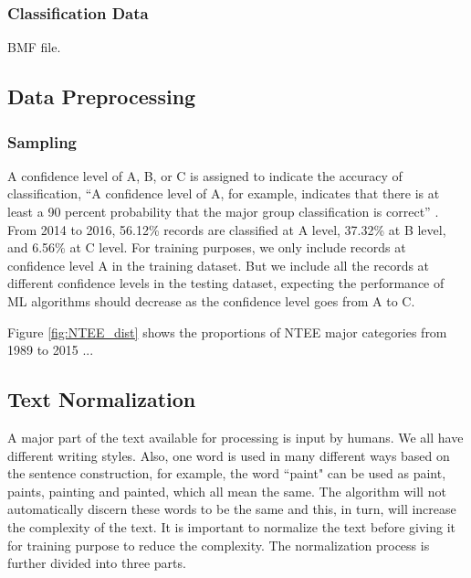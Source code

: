 \documentclass[12pt]{article}
\begin{document}
\subsubsection{Classification Data}
BMF file. 

\subsection{Data Preprocessing}

\subsubsection{Sampling}
A confidence level of A, B, or C is assigned to indicate the accuracy of classification, ``A confidence level of A, for example, indicates that there is at least a 90 percent probability that the major group classification is correct'' \parencite[16]{NationalCenterforCharitableStatisticsGuideUsingNCCS2006}. From 2014 to 2016, 56.12\% records are classified at A level, 37.32\% at B level, and 6.56\% at C level. For training purposes, we only include records at confidence level A in the training dataset. But we include all the records at different confidence levels in the testing dataset, expecting the performance of ML algorithms should decrease as the confidence level goes from A to C.


Figure \ref{fig:NTEE_dist} shows the proportions of NTEE major categories from 1989 to 2015 ... 

\subsection{Text Normalization}
A major part of the text available for processing is input by humans.  We all have different writing styles. Also, one word is used in many different ways based on the sentence construction, for example, the word ``paint" can be used as paint, paints, painting and painted, which all mean the same. The algorithm will not automatically discern these words to be the same and this, in turn, will increase the complexity of the text. It is important to normalize the text before giving it for training purpose to reduce the complexity. The normalization process is further divided into three parts.
\end{document}
